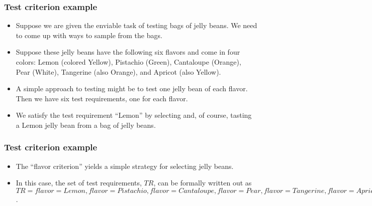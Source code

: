 \begin{frame}[hasprev=false, hasnext=true]
\label{example:test-criterion}
\frametitle{Test criterion example}

\begin{itemize}
	\item Suppose we are given the enviable task of testing bags of jelly beans.
	We need to come up with ways to sample from the bags.

	\item Suppose these jelly beans have the following six flavors and come in
	four colors: Lemon (colored Yellow), Pistachio (Green), Cantaloupe (Orange),
	Pear (White), Tangerine (also Orange), and Apricot (also Yellow).

	\item A simple approach to testing might be to test one jelly bean of each
	flavor. Then we have six test requirements, one for each flavor.

	\item We satisfy the test requirement ``Lemon'' by selecting and, of course,
	tasting a Lemon jelly bean from a bag of jelly beans.
\end{itemize}
\end{frame}


\begin{frame}[hasprev=true, hasnext=false]
\frametitle{Test criterion example}

\begin{itemize}
	\item The ``flavor criterion'' yields a simple strategy for selecting jelly
	beans.

	\item In this case, the set of test requirements, $TR$, can be formally
	written out as $TR = {flavor = Lemon, flavor = Pistachio,
	flavor = Cantaloupe, flavor = Pear, flavor = Tangerine, flavor = Apricot}$.
\end{itemize}
\end{frame}


